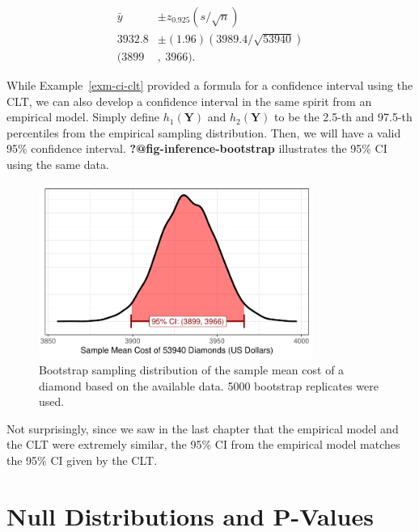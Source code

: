 \documentclass[
  letterpaper,
  DIV=11,
  numbers=noendperiod]{scrreprt}
\theoremstyle{plain}
\theoremstyle{definition}
\theoremstyle{definition}
\theoremstyle{remark}
\begin{document}
\[
\begin{aligned}
  \bar{y} &\pm z_{0.925} \left(s / \sqrt{n}\right) \\
  3932.8 &\pm (1.96) (3989.4 / \sqrt{53940}) \\
  (3899&,\ 3966).
\end{aligned}
\]

While Example~\ref{exm-ci-clt} provided a formula for a confidence
interval using the CLT, we can also develop a confidence interval in the
same spirit from an empirical model. Simply define \(h_1(\mathbf{Y})\)
and \(h_2(\mathbf{Y})\) to be the 2.5-th and 97.5-th percentiles from
the empirical sampling distribution. Then, we will have a valid 95\%
confidence interval. \textbf{?@fig-inference-bootstrap} illustrates the
95\% CI using the same data.

\begin{figure}

{\centering \includegraphics[width=0.8\textwidth,height=\textheight]{./images/fig-samplingdistributions-bootstrap-1.pdf}

}

\caption{\label{fig-samplingdistributions-bootstrap}Bootstrap sampling
distribution of the sample mean cost of a diamond based on the available
data. 5000 bootstrap replicates were used.}

\end{figure}

Not surprisingly, since we saw in the last chapter that the empirical
model and the CLT were extremely similar, the 95\% CI from the empirical
model matches the 95\% CI given by the CLT.

\hypertarget{null-distributions-and-p-values}{%
\section{Null Distributions and
P-Values}\label{null-distributions-and-p-values}}
\end{document}
